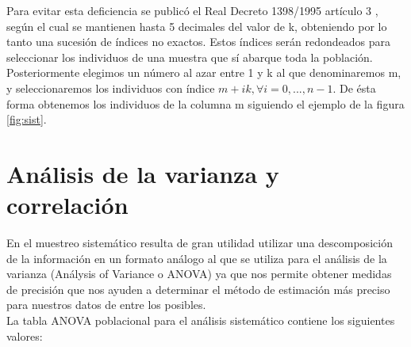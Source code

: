 Para evitar esta deficiencia se publicó el Real Decreto 1398/1995 artículo 3 \cite{RD}, según el cual se mantienen hasta 5 decimales del valor de k, obteniendo por lo tanto una sucesión de índices no exactos. Estos índices serán redondeados para seleccionar los individuos de una muestra que sí abarque toda la población.\\



Posteriormente elegimos un número al azar entre 1 y k al que denominaremos m, y seleccionaremos los individuos con índice $m+ik, \forall i = 0,...,n-1$. De ésta forma obtenemos los individuos de la columna m siguiendo el ejemplo de la figura \ref{fig:sist}.\\

\section{Análisis de la varianza y correlación} \label{sect:5.2}
En el muestreo sistemático resulta de gran utilidad utilizar una descomposición de la información en un formato análogo al que se utiliza para el análisis de la varianza (Análysis of Variance o ANOVA) ya que nos permite obtener medidas de precisión que nos ayuden a determinar el método de estimación más preciso para nuestros datos de entre los posibles. \\

La tabla ANOVA poblacional para el análisis sistemático contiene los siguientes valores:\\

